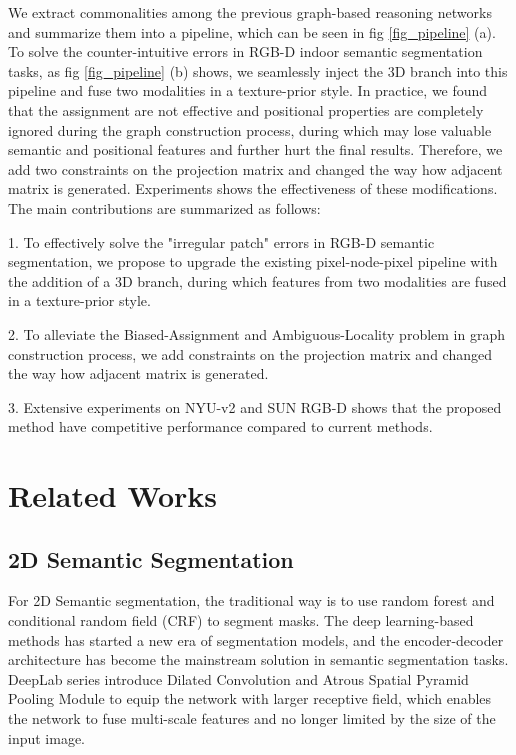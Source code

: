 ﻿\documentclass[journal]{IEEEtran}
\begin{document}
 
    We extract commonalities among the previous graph-based reasoning networks and summarize them into a pipeline, which can be seen in fig \ref{fig_pipeline} (a). To solve the counter-intuitive errors in RGB-D indoor semantic segmentation tasks, as fig \ref{fig_pipeline} (b) shows, we seamlessly inject the 3D branch into this pipeline and fuse two modalities in a texture-prior style. In practice, we found that the assignment are not effective and positional properties are completely ignored during the graph construction process, during which may lose valuable semantic and positional features and further hurt the final results. Therefore, we add two constraints on the projection matrix and changed the way how adjacent matrix is generated. Experiments shows the effectiveness of these modifications. \\   
    
     
    The main contributions are summarized as follows: 

    1. To effectively solve the "irregular patch" errors in RGB-D semantic segmentation, we propose to upgrade the existing pixel-node-pixel pipeline with the addition of a 3D branch, during which features from two modalities are fused in a texture-prior style.
    
    2. To alleviate the Biased-Assignment and Ambiguous-Locality problem in graph construction process, we add constraints on the projection matrix and changed the way how adjacent matrix is generated.

    3. Extensive experiments on NYU-v2 and SUN RGB-D shows that the proposed method have competitive performance compared to current methods. 

\section{Related Works} \label{sec_related}

\subsection{2D Semantic Segmentation}

 
    For 2D Semantic segmentation, the traditional way is to use random forest and conditional random field (CRF) to segment masks. The deep learning-based methods \cite{long2015fully} has started a new era of segmentation models, and the encoder-decoder architecture has become the mainstream solution in semantic segmentation tasks\cite{unet}. DeepLab series\cite{chen2017deeplab}\cite{cheng2020panoptic} introduce Dilated Convolution and Atrous Spatial Pyramid Pooling Module to equip the network with larger receptive field, which enables the network to fuse multi-scale features and no longer limited by the size of the input image. 
    
\end{document}
